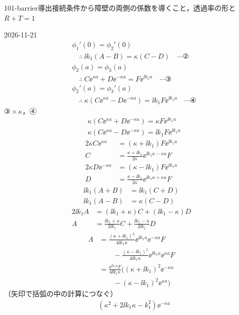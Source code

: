 \documentclass[uplatex,dvipdfmx,a4paper,11pt]{jsarticle}
\begin{document}
\begin{mondai}{101-barrier}{導出}{接続条件から障壁の両側の係数を導くこと，透過率の形と $R+T=1$}
\begin{kotaeutsushi}{2026-11-21}
\begin{align*}
&\phi_{1}'(0)=\phi_{2}'(0)\\
&\quad\therefore\ \ii k_{1}(A-B)=\kappa(C-D)\quad\cdots\text{②}\\
&\phi_{2}(a)=\phi_{3}(a)\\
&\quad\therefore\ C\ee^{\kappa a}+D\ee^{-\kappa a}=F\ee^{\ii k_{1}a}\quad\cdots\text{③}\\
&\phi_{2}'(a)=\phi_{3}'(a)\\
&\quad\therefore\ \kappa(C\ee^{\kappa a}-D\ee^{-\kappa a})=\ii k_{1}F\ee^{\ii k_{1}a}\quad\cdots\text{④}
\end{align*}
③${}\times\kappa$，④
\begin{align*}
&\kappa(C\ee^{\kappa a}+D\ee^{-\kappa a})=\kappa F\ee^{\ii k_{1}a}\\
&\kappa(C\ee^{\kappa a}-D\ee^{-\kappa a})=\ii k_{1}F\ee^{\ii k_{1}a}
\end{align*}
\begin{align*}
2\kappa C\ee^{\kappa a}&=(\kappa+\ii k_{1})F\ee^{\ii k_{1}a}\\
C&=\frac{\kappa+\ii k_{1}}{2\kappa}\ee^{\ii k_{1}a-\kappa a}F\\
2\kappa D\ee^{-\kappa a}&=(\kappa-\ii k_{1})F\ee^{\ii k_{1}a}\\
D&=\frac{\kappa-\ii k_{1}}{2\kappa}\ee^{\ii k_{1}a+\kappa a}F
\end{align*}
\begin{align*}
\ii k_{1}(A+B)&=\ii k_{1}(C+D)\\
\ii k_{1}(A-B)&=\kappa(C-D)
\end{align*}
\begin{align*}
2\ii k_{1}A&=(\ii k_{1}+\kappa)C+(\ii k_{1}-\kappa)D\\
A&=\frac{\ii k_{1}+\kappa}{2\ii k_{1}}C+\frac{\ii k_{1}-\kappa}{2\ii k_{1}}D
\end{align*}
\begin{align*}
A&=\frac{(\kappa+\ii k_{1})^{2}}{4\ii k_{1}\kappa}\ee^{\ii k_{1}a}\ee^{-\kappa a}F\\
&\qquad-\frac{(\kappa-\ii k_{1})^{2}}{4\ii k_{1}\kappa}\ee^{\ii k_{1}a}\ee^{\kappa a}F\\
&=\frac{\ee^{\ii k_{1}a}F}{4\ii k_{1}\kappa}\bigl((\kappa+\ii k_{1})^{2}\ee^{-\kappa a}\\
&\qquad-(\kappa-\ii k_{1})^{2}\ee^{\kappa a}\bigr)
\end{align*}
（矢印で括弧の中の計算につなぐ）
\begin{align*}
&(\kappa^{2}+2\ii k_{1}\kappa-k_{1}^{2})\ee^{-\kappa a}\\

\end{align*}
\end{kotaeutsushi}
\end{mondai}
\end{document}
